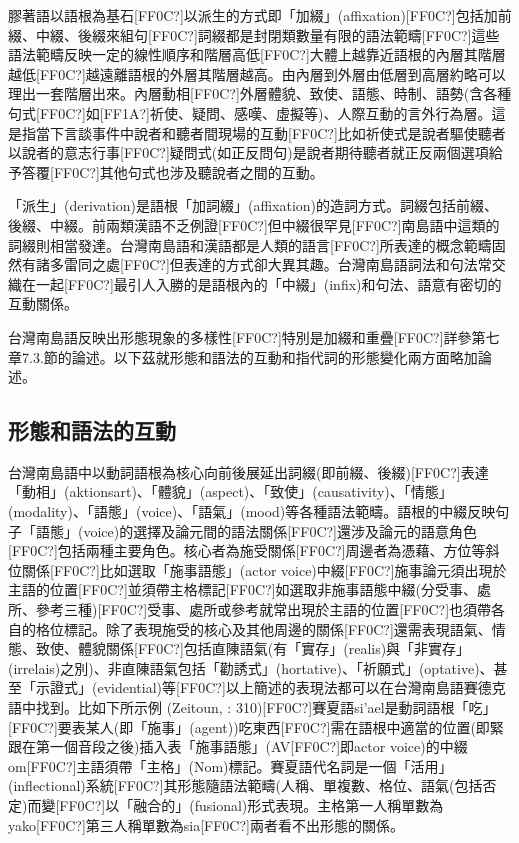 \begin{styleii}
膠著語以語根為基石[FF0C?]以派生的方式即「加綴」(affixation)\textsf{[FF0C?]}包括加前綴、中綴、後綴來組句[FF0C?]詞綴都是封閉類數量有限的語法範疇[FF0C?]這些語法範疇反映一定的線性順序和階層高低[FF0C?]大體上越靠近語根的內層其階層越低[FF0C?]越遠離語根的外層其階層越高。由內層到外層由低層到高層約略可以理出一套階層出來。內層動相[FF0C?]外層體貌、致使、語態、時制、語勢(含各種句式[FF0C?]如[FF1A?]祈使、疑問、感嘆、虛擬等)、人際互動的言外行為層。這是指當下言談事件中說者和聽者間現場的互動[FF0C?]比如祈使式是說者驅使聽者以說者的意志行事[FF0C?]疑問式(如正反問句)是說者期待聽者就正反兩個選項給予答覆[FF0C?]其他句式也涉及聽說者之間的互動。
\end{styleii}

\textrm{「派生」(derivation)是語根「加詞綴」(affixation)的造詞方式。詞綴包括前綴、後綴、中綴。前兩類漢語不乏例證[FF0C?]但中綴很罕見[FF0C?]南島語中這類的詞綴則相當發達。台灣南島語和漢語都是人類的語言[FF0C?]所表達的概念範疇固然有諸多雷同之處[FF0C?]但表達的方式卻大異其趣。台灣南島語詞法和句法常交織在一起[FF0C?]最引人入勝的是語根內的「中綴」(infix)和句法、語意有密切的互動關係。}

\textrm{台灣南島語反映出形態現象的多樣性[FF0C?]特別是加綴和重疊[FF0C?]詳參第七章7.3.節的論述。}以下茲就形態和語法的互動和指代詞的形態變化兩方面略加論述。

\subsection{\textrm{形態和語法的互動}}

\textrm{台灣南島語中以動詞語根為核心向前後展延出詞綴(即前綴、後綴)}[FF0C?]\textrm{表達「動相」(aktionsart)}、\textrm{「體貌」(aspect)}、\textrm{「致使」(causativity)}、\textrm{「情態」(modality)}、\textrm{「語態」(voice)}、\textrm{「語氣」(mood)等各種語法範疇。語根的中綴反映句子「語態」(voice)的選擇及論元間的語法關係[FF0C?]還涉及論元的語意角色[FF0C?]包括兩種主要角色。核心者為施受關係[FF0C?]周邊者為憑藉、方位等斜位關係[FF0C?]比如選取「施事語態」(actor voice)中綴[FF0C?]施事論元須出現於主語的位置[FF0C?]並須帶主格標記[FF0C?]如選取非施事語態中綴(分受事、處所、參考三種)}[FF0C?]\textrm{受事、處所或參考就常出現於主語的位置[FF0C?]也須帶各自的格位標記。除了表現施受的核心及其他周邊的關係[FF0C?]還需表現語氣、情態、致使、體貌關係[FF0C?]包括直陳語氣(有「實存」(realis)與「非實存」(irrelais)之別)}、\textrm{非直陳語氣包括「勸誘式」(hortative)}、\textrm{「祈願式」(optative)}、\textrm{甚至「示證式」(evidential)等[FF0C?]以上簡述的表現法都可以在台灣南島語賽德克語中找到。比如下所示例 (Zeitoun, \citealt{ChuKaybaybaw2015}: 310)}[FF0C?]\textrm{賽夏語si’ael是動詞語根「吃」[FF0C?]要表某人(即「施事」(agent))吃東西[FF0C?]需在語根中適當的位置(即緊跟在第一個音段之後)插入表「施事語態」(AV[FF0C?]即actor voice)的中綴om}[FF0C?]\textrm{主語須帶「主格」(Nom)標記。賽夏語代名詞是一個「活用」(inflectional)系統[FF0C?]其形態隨語法範疇(人稱、單複數、格位、語氣(包括否定)而變[FF0C?]以「融合的」(fusional)形式表現。主格第一人稱單數為yako[FF0C?]第三人稱單數為sia[FF0C?]兩者看不出形態的關係。}

